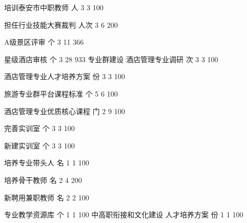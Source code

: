 培训泰安市中职教师 
人
3
3
100%

担任行业技能大赛裁判 
人次
3
6
200%

A级景区评审 
个
3
11
366%

星级酒店审核 
个
3
28
933%
专业群建设
酒店管理专业调研 
次
3
3
100%

酒店管理专业人才培养方案 
份
3
3
100%

旅游专业群平台课程标准 
个
5
6
100%

酒店管理专业优质核心课程 
门
2
9
100%

完善实训室 
个
3
3
100%

新建实训室 
个
3
3
100%

培养专业带头人 
名
1
1
100%

培养骨干教师 
名
2
4
200%

新聘用兼职教师 
名
2
2
100%

专业教学资源库 
个
1
1
100%
中高职衔接和文化建设
人才培养方案
份
1
1
100%

